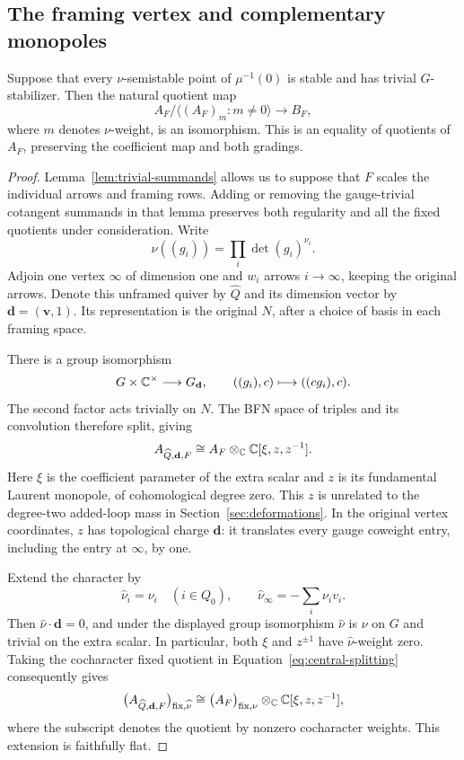 \subsection{The framing vertex and complementary monopoles}

\begin{proposition}\label{prop:cocharacter-fixed}
Suppose that every \(\nu\)-semistable point of \(\mu^{-1}(0)\) is stable
and has trivial \(G\)-stabilizer.  Then the natural quotient map
\[
 A_F/\langle (A_F)_m:m\ne0\rangle
       \longrightarrow B_F,
\]
where \(m\) denotes \(\nu\)-weight, is an isomorphism.
This is an equality of quotients of \(A_F\), preserving the coefficient
map and both gradings.
\end{proposition}

\begin{proof}
Lemma~\ref{lem:trivial-summands} allows us to suppose that \(F\) scales
the individual arrows and framing rows.  Adding or removing the
gauge-trivial cotangent summands in that lemma preserves both regularity
and all the fixed quotients under consideration.
Write
\[
 \nu((g_i))=\prod_i\det(g_i)^{\nu_i}.
\]
Adjoin one vertex \(\infty\) of dimension one and \(w_i\) arrows
\(i\to\infty\), keeping the original arrows.  Denote this unframed
quiver by \(\widehat Q\) and its dimension vector by
\(\mathbf d=(\mathbf v,1)\).
Its representation is the original \(N\), after a choice of basis
in each framing space.

There is a group isomorphism
\[
 G\times\mathbb C^\times\longrightarrow G_{\mathbf d},
 \qquad ((g_i),c)\longmapsto((cg_i),c).
\]
The second factor acts trivially on \(N\).  The BFN space of triples
and its convolution therefore split, giving
\begin{equation}\label{eq:central-splitting}
 A_{\widehat Q,\mathbf d,F}
       \cong A_F\otimes_\mathbb C\mathbb C[\xi,z,z^{-1}].
\end{equation}
Here \(\xi\) is the coefficient parameter of the extra scalar and
\(z\) is its fundamental Laurent monopole, of cohomological degree zero.
This \(z\) is unrelated to the degree-two added-loop mass in
Section~\ref{sec:deformations}.  In the original vertex
coordinates, \(z\) has topological charge \(\mathbf d\): it translates
every gauge coweight entry, including the entry at \(\infty\), by one.

Extend the character by
\[
 \widehat\nu_i=\nu_i\quad(i\in Q_0),
 \qquad
 \widehat\nu_\infty=-\sum_i\nu_i v_i.
\]
Then \(\widehat\nu\cdot\mathbf d=0\), and under the displayed group
isomorphism \(\widehat\nu\) is \(\nu\) on \(G\) and trivial on the
extra scalar.  In particular, both \(\xi\) and \(z^{\pm1}\) have
\(\widehat\nu\)-weight zero.  Taking the cocharacter fixed quotient
in Equation~\eqref{eq:central-splitting} consequently gives
\[
 \bigl(A_{\widehat Q,\mathbf d,F}\bigr)_{\mathrm{fix},\widehat\nu}
 \cong
 \bigl(A_F\bigr)_{\mathrm{fix},\nu}
                 \otimes_\mathbb C\mathbb C[\xi,z,z^{-1}],
\]
where the subscript denotes the quotient by nonzero cocharacter
weights.  This extension is faithfully flat.


\end{proof}
